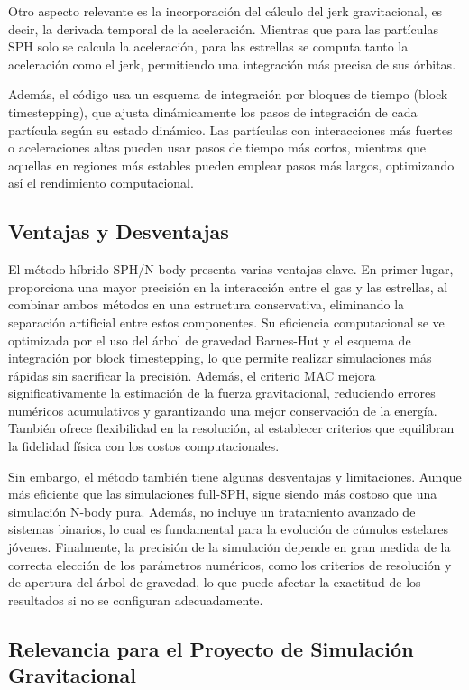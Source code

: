 Otro aspecto relevante es la incorporación del cálculo del jerk gravitacional, es decir, la derivada temporal de la aceleración. Mientras que para las partículas SPH solo se calcula la aceleración, para las estrellas se computa tanto la aceleración como el jerk, permitiendo una integración más precisa de sus órbitas.

Además, el código usa un esquema de integración por bloques de tiempo (block timestepping), que ajusta dinámicamente los pasos de integración de cada partícula según su estado dinámico. Las partículas con interacciones más fuertes o aceleraciones altas pueden usar pasos de tiempo más cortos, mientras que aquellas en regiones más estables pueden emplear pasos más largos, optimizando así el rendimiento computacional.

\subsection{Ventajas y Desventajas}

El método híbrido SPH/N-body presenta varias ventajas clave. En primer lugar, proporciona una mayor precisión en la interacción entre el gas y las estrellas, al combinar ambos métodos en una estructura conservativa, eliminando la separación artificial entre estos componentes. Su eficiencia computacional se ve optimizada por el uso del árbol de gravedad Barnes-Hut y el esquema de integración por block timestepping, lo que permite realizar simulaciones más rápidas sin sacrificar la precisión. Además, el criterio MAC mejora significativamente la estimación de la fuerza gravitacional, reduciendo errores numéricos acumulativos y garantizando una mejor conservación de la energía. También ofrece flexibilidad en la resolución, al establecer criterios que equilibran la fidelidad física con los costos computacionales.

Sin embargo, el método también tiene algunas desventajas y limitaciones. Aunque más eficiente que las simulaciones full-SPH, sigue siendo más costoso que una simulación N-body pura. Además, no incluye un tratamiento avanzado de sistemas binarios, lo cual es fundamental para la evolución de cúmulos estelares jóvenes. Finalmente, la precisión de la simulación depende en gran medida de la correcta elección de los parámetros numéricos, como los criterios de resolución y de apertura del árbol de gravedad, lo que puede afectar la exactitud de los resultados si no se configuran adecuadamente.

\subsection{Relevancia para el Proyecto de Simulación Gravitacional}

